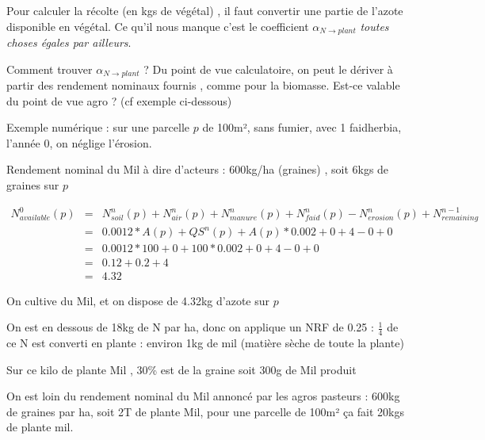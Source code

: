 \documentclass[10pt,a4paper,french]{article} %
\begin{document}
Pour calculer la récolte (en kgs de végétal) , il faut convertir une partie de l'azote disponible en végétal.
Ce qu'il nous manque c'est le coefficient $\alpha_{N \rightarrow plant}$  \emph{toutes choses égales par ailleurs}. 




\begin{tcolorbox}[noparskip,
    colback=LightGreen,colframe=DarkGreen,%
    colbacklower=LimeGreen!75!LightGreen,%
    title=Question/Problème]

Comment trouver $\alpha_{N \rightarrow plant}$  ? Du point de vue calculatoire, on peut le dériver à partir des rendement nominaux fournis , comme pour la biomasse. Est-ce valable du point de vue agro ? (cf exemple ci-dessous)

\end{tcolorbox}


Exemple numérique : 
sur une parcelle $p$ de 100m², sans fumier, avec 1 faidherbia, l'année 0, on néglige l'érosion.

Rendement nominal du Mil à dire d'acteurs : 600kg/ha (graines) , soit 6kgs de graines sur $p$

\begin{eqnarray*}
N_{available}^{0}(p)&=&N_{soil}^{n}(p)  +N_{air}^{n}(p)+N_{manure}^{n}(p)+N_{faid}^{n}(p)-N_{erosion}^n(p) + N_{remaining}^{n-1} \\
                    &=& 0.0012 * A(p) + QS^{n}(p) + A(p) * 0.002 +0                +4              -0                + 0  \\
                    &=&  0.0012 * 100 + 0 + 100 * 0.002 +0+4-0 + 0  \\
                    &=&  0.12 + 0.2 +4  \\
                    &=& 4.32
\end{eqnarray*}

On cultive  du Mil, et on dispose de 4.32kg d'azote sur $p$

On est en dessous de 18kg de N par ha, donc on applique un NRF de 0.25 : $\frac{1}{4}$ de ce N est converti en plante : environ 1kg de mil (matière sèche de toute la plante)

Sur ce kilo de plante Mil , 30\% est de la graine soit 300g de Mil produit

On est loin du rendement nominal du Mil annoncé par les agros pasteurs : 600kg de graines par ha, soit 2T de plante Mil, pour une parcelle de 100m² ça fait 20kgs de plante mil.  
\end{document}
